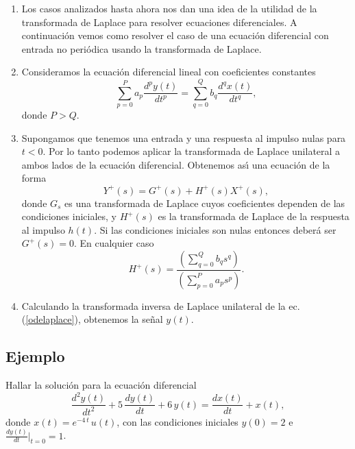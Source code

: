 \begin{enumerate}

\item Los casos analizados hasta ahora nos dan una idea de la utilidad de la transformada de Laplace para
resolver ecuaciones diferenciales. A continuaci\'{o}n vemos como resolver el caso de una ecuaci\'{o}n
diferencial con entrada no peri\'{o}dica usando la transformada de Laplace.

\item Consideramos la ecuaci\'{o}n diferencial lineal con coeficientes constantes
\begin{equation}
  \sum_{p=0}^{P}a_{p}\frac{d^{p}y\left( t\right) }{dt^{p}}=
           \sum_{q=0}^{Q}b_{q}\frac{d^{q}x\left( t\right) }{dt^{q}},
\end{equation}
donde $P > Q$.

\item Supongamos que tenemos una entrada y una respuesta al impulso  nulas para $t < 0$.
Por lo tanto podemos aplicar la transformada de Laplace unilateral a ambos lados de la ecuaci\'{o}n
diferencial. Obtenemos as\'{\i} una ecuaci\'{o}n de la forma
\begin{equation}
  Y^{+}(s) = G^{+}(s) + H^{+}(s) X^{+}(s), \label{odelaplace}
\end{equation}
donde $G_{s}$ es una transformada de Laplace cuyos coeficientes dependen de las condiciones iniciales,
y $H^{+}(s)$ es la transformada de Laplace de la respuesta al impulso $h(t)$. Si las condiciones iniciales
son nulas entonces deber\'{a} ser $G^{+}(s) = 0$. En cualquier caso
\begin{equation}
  H^{+}(s) =      
  \frac{\left( \sum_{q=0}^{Q}b_{q}s^{q}\right) }{\left(\sum_{p=0}^{P}a_{p}s^{p}\right) }.
\end{equation}

\item Calculando la transformada inversa de Laplace unilateral de la ec. (\ref{odelaplace}), obtenemos la se\~{n}al $y(t)$.

\end{enumerate}


\subsection{Ejemplo}

Hallar la soluci\'{o}n para la ecuaci\'{o}n diferencial
\begin{equation}
\frac{d^{2}y(t)}{dt^{2}} + 5 \, \frac{dy(t)}{dt} + 6 \, y(t) = 
\frac{dx(t)}{dt} + x(t),
\end{equation}
donde $x(t) = e^{-4 \, t} \, u(t)$, con las condiciones iniciales $y(0) = 2$ e 
$\frac{dy(t)}{dt}|_{t=0} = 1$.


